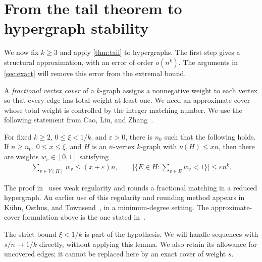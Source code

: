 \section{From the tail theorem to hypergraph stability}\label{sec:stability}

We now fix $k\ge3$ and apply \cref{thm:tail} to hypergraphs. The first step gives a structural approximation, with an error of order $o(n^k)$. The arguments in \cref{sec:exact} will remove this error from the extremal bound.

A \emph{fractional vertex cover} of a $k$-graph assigns a nonnegative weight to each vertex so that every edge has total weight at least one. We need an approximate cover whose total weight is controlled by the integer matching number. We use the following statement from Cao, Liu, and Zhang~\cite[Lemma 3.2]{CLZ2026}.
\begin{lemma}\label{lem:approximate-cover}
For fixed $k\ge2$, $0\le\xi<1/k$, and $\varepsilon>0$, there is $n_0$ such that the following holds. If $n\ge n_0$, $0\le x\le\xi$, and $H$ is an $n$-vertex $k$-graph with $\nu(H)\le xn$, then there are weights $w_v\in[0,1]$ satisfying
\begin{align*}
\sum_{v\in V(H)}w_v\le(x+\varepsilon)n,
\qquad
\bigl|\{E\in H\colon\sum_{v\in E}w_v<1\}\bigr|\le\varepsilon n^k.
\end{align*}
\end{lemma}

The proof in~\cite{CLZ2026} uses weak regularity and rounds a fractional matching in a reduced hypergraph. An earlier use of this regularity and rounding method appears in K\"uhn, Osthus, and Townsend~\cite[proof of Lemma 5.6]{KOT2014}, in a minimum-degree setting. The approximate-cover formulation above is the one stated in~\cite[Lemma 3.2]{CLZ2026}.

The strict bound $\xi<1/k$ is part of the hypothesis. We will handle sequences with $s/n\to1/k$ directly, without applying this lemma. We also retain its allowance for uncovered edges; it cannot be replaced here by an exact cover of weight $s$.

